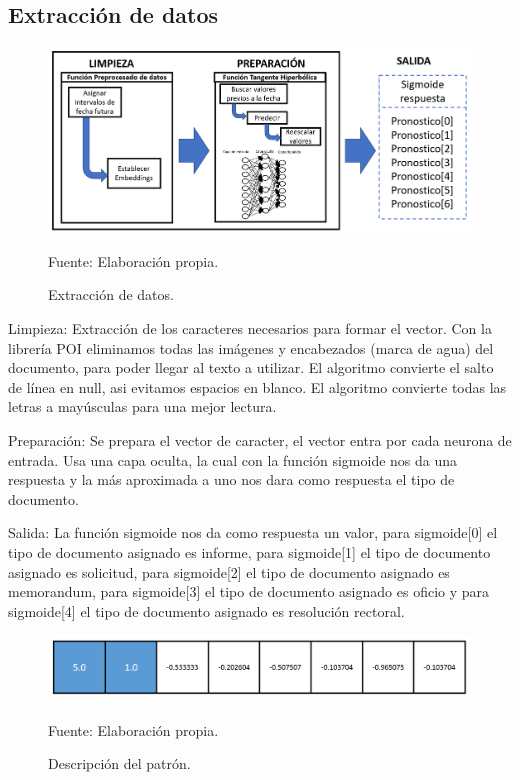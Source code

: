 \subsection{Extracción de datos}
\begin{figure}[h!]
	\centering
		\includegraphics[scale=0.5]{imagenes/extracciondatos.png}
		\caption{Extracción de datos.}
	\begin{center}
    Fuente: Elaboración propia.
    \end{center}
	\label{fig:extracciondedatos}
\end{figure}

Limpieza:
Extracción de los caracteres necesarios para formar el vector.
Con la librería POI eliminamos todas las imágenes y encabezados (marca de agua) del documento, para poder llegar al texto a utilizar.
El algoritmo convierte el salto de línea en null, asi evitamos espacios en blanco.
El algoritmo convierte todas las letras a mayúsculas para una mejor lectura.

Preparación:
Se prepara el vector de caracter, el vector entra por cada neurona de entrada.
Usa una capa oculta, la cual con la función sigmoide nos da una respuesta y la más aproximada a uno nos dara como respuesta el tipo de documento.

Salida:
La función sigmoide nos da como respuesta un valor, para sigmoide[0] el tipo de documento asignado es informe, para sigmoide[1] el tipo de documento asignado es solicitud, para sigmoide[2] el tipo de documento asignado es memorandum, para sigmoide[3] el tipo de documento asignado es oficio y para sigmoide[4] el tipo de documento asignado es resolución rectoral.

\begin{figure}[h!]
	\centering
		\includegraphics[scale=0.4]{imagenes/vectorcaracteristico.png}
		\caption{Descripción del patrón.}
	\begin{center}
    Fuente: Elaboración propia.
    \end{center}
	\label{fig:DescriPatron}
\end{figure}
